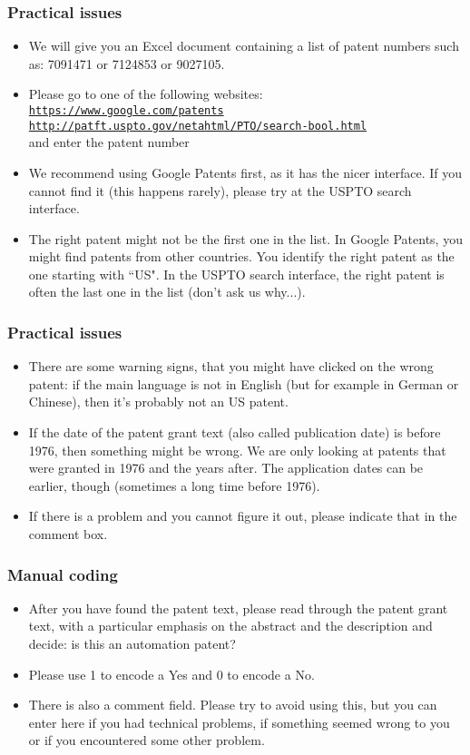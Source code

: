\documentclass[10pt]{beamer}
\begin{document}
\begin{frame}\frametitle{Practical issues}
	\begin{itemize}	
	\item We will give you an Excel document containing a list of patent numbers such as: 7091471 or 7124853 or 9027105.
	\item Please go to one of the following websites: \\[0.1cm]
 \href{https://www.google.com/patents}{\texttt{https://www.google.com/patents}}\\[0.1cm]
\href{http://patft.uspto.gov/netahtml/PTO/search-bool.html}{\texttt{http://patft.uspto.gov/netahtml/PTO/search-bool.html}}\\[0.1cm]
	and enter the patent number
	\item We recommend using Google Patents first, as it has the nicer interface. If you cannot find it (this happens rarely), please try at the USPTO search interface.
	\item The right patent might not be the first one in the list. In Google Patents, you might find patents from other countries. You identify the right patent as the one starting with ``US". In the USPTO search interface, the right patent is often the last one in the list (don't ask us why...).
	\end{itemize}
\end{frame}

\begin{frame}\frametitle{Practical issues}
	\begin{itemize}	
	\item There are some warning signs, that you might have clicked on the wrong patent: if the main language is not in English (but for example in German or Chinese), then it's probably not an US patent.
	\item If the date of the patent grant text (also called publication date) is before 1976, then something might be wrong. We are only looking at patents that were granted in 1976 and the years after. The application dates can be earlier, though (sometimes a long time before 1976). 
	\item If there is a problem and you cannot figure it out, please indicate that in the comment box.
	\end{itemize}
\end{frame}


\begin{frame}\frametitle{Manual coding}
	\begin{itemize}	
	\item After you have found the patent text, please read through the patent grant text, with a particular emphasis on the abstract and the description and decide: is this an automation patent?
	\item Please use 1 to encode a Yes and 0 to encode a No.
	\item There is also a comment field. Please try to avoid using this, but you can enter here if you had technical problems, if something seemed wrong to you or if you encountered some other problem.
	\end{itemize}
\end{frame}
\end{document}
